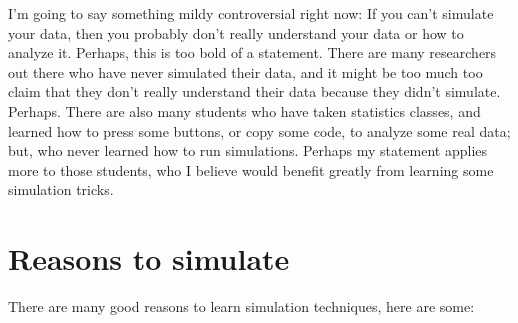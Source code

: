 \documentclass[]{book}
\begin{document}
I'm going to say something mildy controversial right now: If you can't simulate your data, then you probably don't really understand your data or how to analyze it. Perhaps, this is too bold of a statement. There are many researchers out there who have never simulated their data, and it might be too much too claim that they don't really understand their data because they didn't simulate. Perhaps. There are also many students who have taken statistics classes, and learned how to press some buttons, or copy some code, to analyze some real data; but, who never learned how to run simulations. Perhaps my statement applies more to those students, who I believe would benefit greatly from learning some simulation tricks.

\hypertarget{reasons-to-simulate}{%
\section{Reasons to simulate}\label{reasons-to-simulate}}

There are many good reasons to learn simulation techniques, here are some:
\end{document}
